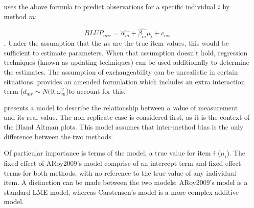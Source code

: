 \documentclass[12pt, a4paper]{report}
\theoremstyle{plain}
\theoremstyle{definition}
\theoremstyle{remark}
\begin{document}
	\citet{BXC2004} uses the above formula to predict observations for
	a specific individual $i$ by method $m$;
	
	\begin{equation}BLUP_{mir} = \hat{\alpha_{m}} + \hat{\beta_{m}}\mu_{i} +
	c_{mi} \end{equation}. Under the assumption that the $\mu$s are
	the true item values, this would be sufficient to estimate
	parameters. When that assumption doesn't hold, regression
	techniques (known as updating techniques) can be used additionally
	to determine the estimates. The assumption of exchangeability can
	be unrealistic in certain situations. \citet{BXC2004} provides an
	amended formulation which includes an extra interaction term ($
	d_{mr} \sim N(0,\omega^{2}_{m}$)to account for this.
	
	
	
	\citet{BXC2004} presents a model to describe the relationship between a value of measurement and its
	real value. The non-replicate case is considered first, as it is the context of the Bland Altman plots. This model assumes that inter-method bias is the only difference between the two methods.
	
	
	
	Of particular importance is terms of the model, a true value for item $i$ ($\mu_{i}$).  The fixed effect of ARoy2009's model comprise of an intercept term and fixed effect terms for both methods, with no reference to the true value of any individual item. A distinction can be made between the two models: ARoy2009's model is a standard LME model, whereas Carstensen's model is a more complex additive model.
	
	
	
\end{document}
